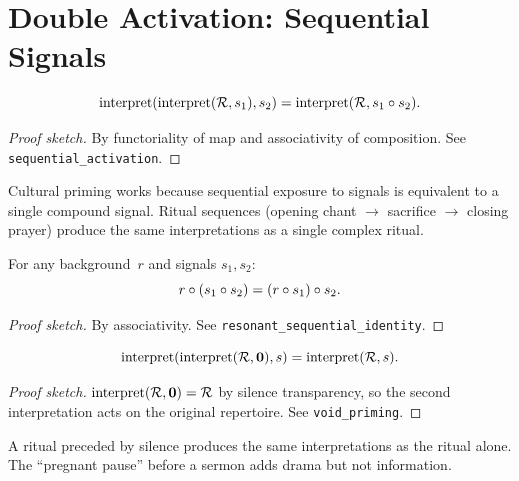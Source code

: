 \section{Double Activation: Sequential Signals}
\label{sec:ch4:double}

\begin{theorem}
\label{thm:sequential-activation}
\[
  \operatorname{interpret}(\operatorname{interpret}(\mathcal{R}, s_1), s_2)
  = \operatorname{interpret}(\mathcal{R}, s_1 \circ s_2).
\]
\end{theorem}

\begin{proof}[Proof sketch]
By functoriality of map and associativity of composition.
See \texttt{sequential\_activation}.
\end{proof}

\begin{remark}
Cultural priming works because sequential exposure to signals is
equivalent to a single compound signal.  Ritual sequences (opening chant
$\to$ sacrifice $\to$ closing prayer) produce the same interpretations
as a single complex ritual.
\end{remark}

\begin{theorem}
\label{thm:resonant-sequential}
For any background~$r$ and signals $s_1, s_2$:
\[
  r \circ (s_1 \circ s_2) = (r \circ s_1) \circ s_2.
\]
\end{theorem}

\begin{proof}[Proof sketch]
By associativity.  See \texttt{resonant\_sequential\_identity}.
\end{proof}

\begin{theorem}
\label{thm:void-priming}
\[
  \operatorname{interpret}(\operatorname{interpret}(\mathcal{R}, \mathbf{0}), s)
  = \operatorname{interpret}(\mathcal{R}, s).
\]
\end{theorem}

\begin{proof}[Proof sketch]
$\operatorname{interpret}(\mathcal{R}, \mathbf{0}) = \mathcal{R}$ by silence transparency,
so the second interpretation acts on the original repertoire.
See \texttt{void\_priming}.
\end{proof}

\begin{remark}
A ritual preceded by silence produces the same interpretations as the
ritual alone.  The ``pregnant pause'' before a sermon adds drama but not
information.
\end{remark}

